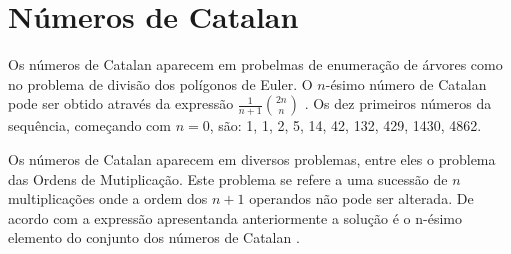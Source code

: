 \chapter{Números de Catalan}
Os números de Catalan aparecem em probelmas de enumeração de árvores como no problema de divisão dos polígonos de Euler. O $n$-ésimo número de Catalan pode ser obtido através da expressão $\frac{1}{n+1} \binom{2n}{n} $ \cite{wolfram}. Os dez primeiros números da sequência, começando com $n = 0$, são: 1, 1, 2, 5, 14, 42, 132, 429, 1430, 4862.

Os números de Catalan aparecem em diversos problemas, entre eles o problema das Ordens de Mutiplicação.
Este problema se refere a uma sucessão de $n$ multiplicações onde a ordem dos $n+1$ operandos não pode ser alterada. De acordo com a expressão apresentanda anteriormente a solução é o n-ésimo elemento do conjunto dos números de Catalan \cite{catNum}.
